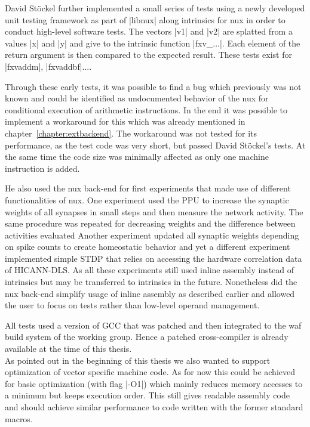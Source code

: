 David Stöckel further implemented a small series of tests using a newly developed unit testing framework as part of |libnux| along intrinsics for nux in order to conduct high-level software tests.
The vectors |v1| and |v2| are splatted from a values |x| and |y| and give to the intrinsic function |fxv_...|.
Each element of the return argument is then compared to the expected result.
These tests exist for |fxvaddm|, |fxvaddbf|....

Through these early tests, it was possible to find a bug which previously was not known and could be identified as undocumented behavior of the nux for conditional execution of arithmetic instructions.
In the end it was possible to implement a workaround for this which was already mentioned in chapter~\ref{chapter:extbackend}.
The workaround was not tested for its performance, as the test code was very short, but passed David Stöckel's tests.
At the same time the code size was minimally affected as only one machine instruction is added.

He also used the nux back-end for first experiments that made use of different functionalities of nux.
One experiment used the \ac{PPU} to increase the synaptic weights of all synapses in small steps and then measure the network activity.
The same procedure was repeated for decreasing weights and the difference between activities evaluated
Another experiment updated all synaptic weights depending on spike counts to create homeostatic behavior and yet a different experiment implemented simple \ac{STDP} that relies on accessing the hardware correlation data of \ac{HICANN-DLS}.
As all these experiments still used inline assembly instead of intrinsics but may be transferred to intrinsics in the future.
Nonetheless did the nux back-end simplify usage of inline assembly as described earlier and allowed the user to focus on tests rather than low-level operand management.

All tests used a version of GCC that was patched and then integrated to the waf build system of the working group.
Hence a patched cross-compiler is already available at the time of this thesis.
\\
As pointed out in the beginning of this thesis we also wanted to support optimization of vector specific machine code.
As for now this could be achieved for basic optimization (with flag |-O1|) which mainly reduces memory accesses to a minimum but keeps execution order.
This still gives readable assembly code and should achieve similar performance to code written with the former standard macros.

